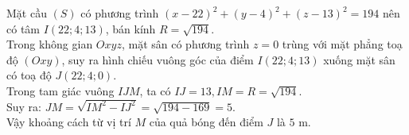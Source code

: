 \begin{ex}
{\begin{center}
		\end{center}
		Mặt cầu $(S)$ có phương trình
		$(x-22)^2+(y-4)^2+(z-13)^2=194$ nên có tâm $I(22;4;13)$, bán kính $R=\sqrt{194}$.\\
		Trong không gian $Oxyz$, mặt sân có phương trình $z=0$ trùng với mặt phẳng toạ độ $(Oxy)$, suy ra hình chiếu vuông góc của điểm $I(22;4;13)$ xuống mặt sân có toạ độ $J(22;4;0)$.\\
		Trong tam giác vuông $IJM$, ta có $IJ=13,IM=R=\sqrt{194}$.\\
		Suy ra: $JM=\sqrt{IM^2-IJ^2}=\sqrt{194-169}=5$.\\
		Vậy khoảng cách từ vị trí $M$ của quả bóng đến điểm $J$ là $5$ m.	
	}
\end{ex}


